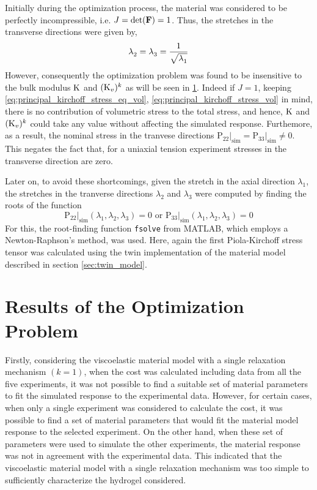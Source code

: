 Initially during the optimization process, the material was considered to be perfectly incompressible, i.e. \(J=\text{det}(\mathbf{F}{})=1\). Thus, the stretches in the transverse directions were given by, 
\begin{equation}
    \lambda^{}_{{2}} = \lambda^{}_{{3}} = \frac{1}{\sqrt{\lambda^{}_{{1}}}}
\end{equation}
However, consequently the optimization problem was found to be insensitive to the bulk modulus \(\mathrm{K}\) and \((\mathrm{K}_{v})^{k}\) as will be seen in \cref{sec:optimizataion_results}. Indeed if \(J=1\), keeping \cref{eq:principal_kirchoff_stress_eq_vol}, \cref{eq:principal_kirchoff_stress_vol} in mind, there is no contribution of volumetric stress to the total stress, and hence, \(\mathrm{K}\) and \((\mathrm{K}_{v})^{k}\) could take any value without affecting the simulated response. Furthemore, as a result, the nominal stress in the tranvese directions \(\mathrm{P}_{22}{|}_{\text{sim}} = \mathrm{P}_{33}{|}_{\text{sim}} \neq 0\). This negates the fact that, for a uniaxial tension experiment stresses in the transverse direction are zero. 

Later on, to avoid these shortcomings, given the stretch in the axial direction \(\lambda_1\), the stretches in the tranverse directions \(\lambda_2\) and \(\lambda_3\) were computed by finding the roots of the function
\begin{equation}
    \mathrm{P}_{22}{|}_{\text{sim}}(\lambda_1, \lambda_2, \lambda_3) = 0 \text{ or } \mathrm{P}_{33}{|}_{\text{sim}} (\lambda_1, \lambda_2, \lambda_3) = 0
    \label{eq:optimization_NR}
\end{equation}
For this, the root-finding function \texttt{fsolve} from MATLAB, which employs a Newton-Raphson's method, was used. Here, again the first Piola-Kirchoff stress tensor was calculated using the twin implementation of the material model described in section \cref{sec:twin_model}.

\section{Results of the Optimization Problem}
\label{sec:optimizataion_results}
Firstly, considering the viscoelastic material model with a single relaxation mechanism \((k=1)\), when the cost was calculated including data from all the five experiments, it was not possible to find a suitable set of material parameters to fit the simulated response to the experimental data. However, for certain cases, when only a single experiment was considered to calculate the cost, it was possible to find a set of material parameters that would fit the material model response to the selected experiment. On the other hand, when these set of parameters were used to simulate the other experiments, the material response was not in agreement with the experimental data. This indicated that the viscoelastic material model with a single relaxation mechanism was too simple to sufficiently characterize the hydrogel considered. 

